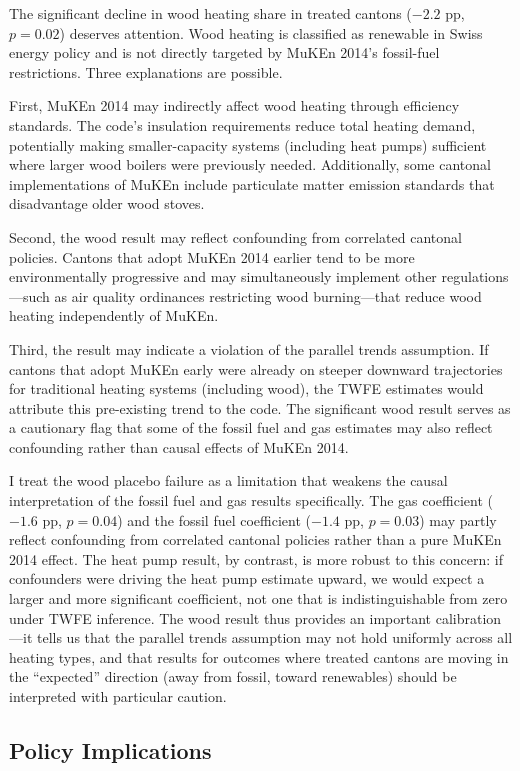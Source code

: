 \documentclass[12pt]{article}
\begin{document}
The significant decline in wood heating share in treated cantons ($-2.2$ pp, $p = 0.02$) deserves attention. Wood heating is classified as renewable in Swiss energy policy and is not directly targeted by MuKEn 2014's fossil-fuel restrictions. Three explanations are possible.

First, MuKEn 2014 may indirectly affect wood heating through efficiency standards. The code's insulation requirements reduce total heating demand, potentially making smaller-capacity systems (including heat pumps) sufficient where larger wood boilers were previously needed. Additionally, some cantonal implementations of MuKEn include particulate matter emission standards that disadvantage older wood stoves.

Second, the wood result may reflect confounding from correlated cantonal policies. Cantons that adopt MuKEn 2014 earlier tend to be more environmentally progressive and may simultaneously implement other regulations---such as air quality ordinances restricting wood burning---that reduce wood heating independently of MuKEn.

Third, the result may indicate a violation of the parallel trends assumption. If cantons that adopt MuKEn early were already on steeper downward trajectories for traditional heating systems (including wood), the TWFE estimates would attribute this pre-existing trend to the code. The significant wood result serves as a cautionary flag that some of the fossil fuel and gas estimates may also reflect confounding rather than causal effects of MuKEn 2014.

I treat the wood placebo failure as a limitation that weakens the causal interpretation of the fossil fuel and gas results specifically. The gas coefficient ($-1.6$ pp, $p = 0.04$) and the fossil fuel coefficient ($-1.4$ pp, $p = 0.03$) may partly reflect confounding from correlated cantonal policies rather than a pure MuKEn 2014 effect. The heat pump result, by contrast, is more robust to this concern: if confounders were driving the heat pump estimate upward, we would expect a larger and more significant coefficient, not one that is indistinguishable from zero under TWFE inference. The wood result thus provides an important calibration---it tells us that the parallel trends assumption may not hold uniformly across all heating types, and that results for outcomes where treated cantons are moving in the ``expected'' direction (away from fossil, toward renewables) should be interpreted with particular caution.

\subsection{Policy Implications}
\end{document}
